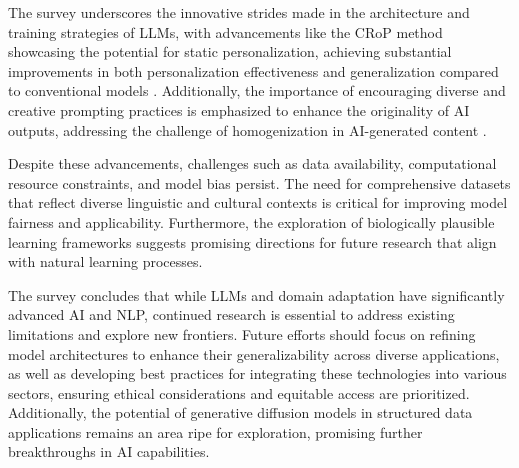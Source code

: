 The survey underscores the innovative strides made in the architecture and training strategies of LLMs, with advancements like the CRoP method showcasing the potential for static personalization, achieving substantial improvements in both personalization effectiveness and generalization compared to conventional models \cite{kaur2024cropcontextwiserobuststatic}. Additionally, the importance of encouraging diverse and creative prompting practices is emphasized to enhance the originality of AI outputs, addressing the challenge of homogenization in AI-generated content \cite{palmini2024patternscreativityuserinput}.



Despite these advancements, challenges such as data availability, computational resource constraints, and model bias persist. The need for comprehensive datasets that reflect diverse linguistic and cultural contexts is critical for improving model fairness and applicability. Furthermore, the exploration of biologically plausible learning frameworks suggests promising directions for future research that align with natural learning processes.



The survey concludes that while LLMs and domain adaptation have significantly advanced AI and NLP, continued research is essential to address existing limitations and explore new frontiers. Future efforts should focus on refining model architectures to enhance their generalizability across diverse applications, as well as developing best practices for integrating these technologies into various sectors, ensuring ethical considerations and equitable access are prioritized. Additionally, the potential of generative diffusion models in structured data applications remains an area ripe for exploration, promising further breakthroughs in AI capabilities.
